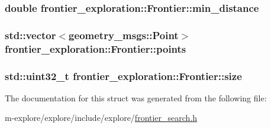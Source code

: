 \subsubsection[{\texorpdfstring{min\+\_\+distance}{min_distance}}]{\setlength{\rightskip}{0pt plus 5cm}double frontier\+\_\+exploration\+::\+Frontier\+::min\+\_\+distance}\hypertarget{structfrontier__exploration_1_1Frontier_a9d55b8e1c1276ad52d303e350eb01b36}{}\label{structfrontier__exploration_1_1Frontier_a9d55b8e1c1276ad52d303e350eb01b36}
\subsubsection[{\texorpdfstring{points}{points}}]{\setlength{\rightskip}{0pt plus 5cm}std\+::vector$<$geometry\+\_\+msgs\+::\+Point$>$ frontier\+\_\+exploration\+::\+Frontier\+::points}\hypertarget{structfrontier__exploration_1_1Frontier_ad124fa5a17e45fedd9e9b00d34182ea3}{}\label{structfrontier__exploration_1_1Frontier_ad124fa5a17e45fedd9e9b00d34182ea3}
\subsubsection[{\texorpdfstring{size}{size}}]{\setlength{\rightskip}{0pt plus 5cm}std\+::uint32\+\_\+t frontier\+\_\+exploration\+::\+Frontier\+::size}\hypertarget{structfrontier__exploration_1_1Frontier_ab850ad2ae90bf0308cba48ad9d8dec4c}{}\label{structfrontier__exploration_1_1Frontier_ab850ad2ae90bf0308cba48ad9d8dec4c}


The documentation for this struct was generated from the following file\+:\begin{DoxyCompactItemize}
\item 
m-\/explore/explore/include/explore/\hyperlink{frontier__search_8h}{frontier\+\_\+search.\+h}\end{DoxyCompactItemize}
